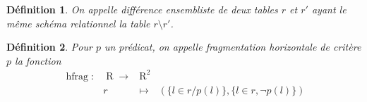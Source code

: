 \documentclass[french]{article}
\DeclareMathOperator{\R}{R}
\DeclareMathOperator{\hfrag}{hfrag}
\newtheorem{defi}{Définition}
\begin{document}
\begin{defi}
	On appelle \emph{différence ensembliste}
	de deux tables $r$ et $r'$ ayant le même schéma relationnel
	la table $r \setminus r'$.
\end{defi}

\begin{defi}
	Pour $p$ un prédicat, on appelle \emph{fragmentation horizontale 
		de critère $p$}
	la fonction
	$$
	\begin{array}{llcl}
	\hfrag : & \R \rightarrow & \R^2 \\
			& r & \mapsto & (\{l \in r / p(l)\} , \{l \in r, \neg p(l)\})
	\end{array}
	$$
\end{defi}
\end{document}
